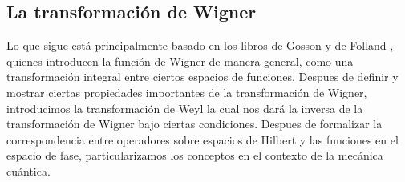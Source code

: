 \documentclass[a4paper]{report}
\begin{document}
  \subsection{La transformación de Wigner}

   Lo que sigue está
  principalmente basado en los libros de Gosson
  \cite{gossonWignerTransform2017} y de Folland
  \cite{follandHarmonicAnalysisPhase1989}, quienes
  introducen la función de Wigner de manera general, como
  una transformación integral entre ciertos espacios de
  funciones. Despues de definir y mostrar ciertas
  propiedades importantes de la transformación de Wigner,
  introducimos la transformación de Weyl la cual nos dará la
  inversa de la transformación de Wigner bajo ciertas
  condiciones. Despues de formalizar la correspondencia
  entre operadores sobre espacios de Hilbert y las funciones
  en el espacio de fase, particularizamos los conceptos en
  el contexto de la mecánica cuántica. 
\end{document}

